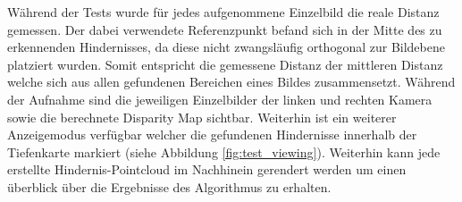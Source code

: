 \noindent
Während der Tests wurde für jedes aufgenommene Einzelbild die reale Distanz gemessen. Der dabei verwendete Referenzpunkt befand sich in der Mitte des zu erkennenden Hindernisses, da diese nicht zwangsläufig orthogonal zur Bildebene platziert wurden. Somit entspricht die gemessene Distanz der mittleren Distanz welche sich aus allen gefundenen Bereichen eines Bildes zusammensetzt. Während der Aufnahme sind die jeweiligen Einzelbilder der linken und rechten Kamera sowie die berechnete Disparity Map sichtbar. Weiterhin ist ein weiterer Anzeigemodus verfügbar welcher die gefundenen Hindernisse innerhalb der Tiefenkarte markiert (siehe Abbildung \ref{fig:test_viewing}). Weiterhin kann jede erstellte Hindernis-Pointcloud im Nachhinein gerendert werden um einen überblick über die Ergebnisse des Algorithmus zu erhalten.\\

